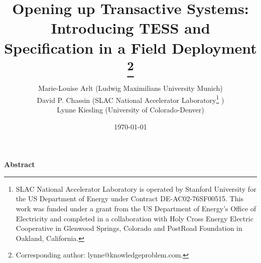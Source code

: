 \documentclass[12pt]{article}%
\begin{document}
\setcounter{page}{0}



\singlespacing

\title{
Opening up Transactive Systems: Introducing TESS and Specification in a Field Deployment
\thanks{Corresponding author: lynne@knowledgeproblem.com. 
} 
\\ }

\date{\today}
\author{Marie-Louise Arlt (Ludwig Maximilians University Munich) \\ David P. Chassin (SLAC National Accelerator Laboratory\footnote{SLAC National Accelerator Laboratory is operated by Stanford University for the US Department of Energy under Contract DE-AC02-76SF00515. This work was funded under a grant from the US Department of Energy's Office of Electricity and completed in a collaboration with Holy Cross Energy Electric Cooperative in Glenwood Springs, Colorado and PostRoad Foundation in Oakland, California.} ) \\ Lynne Kiesling (University of Colorado-Denver) \\}  
\maketitle

\thispagestyle{empty}

\sloppy%


\thispagestyle{empty}


\singlespacing
\begin{center}
\large \textbf{Abstract}
\end{center}
\end{document}
